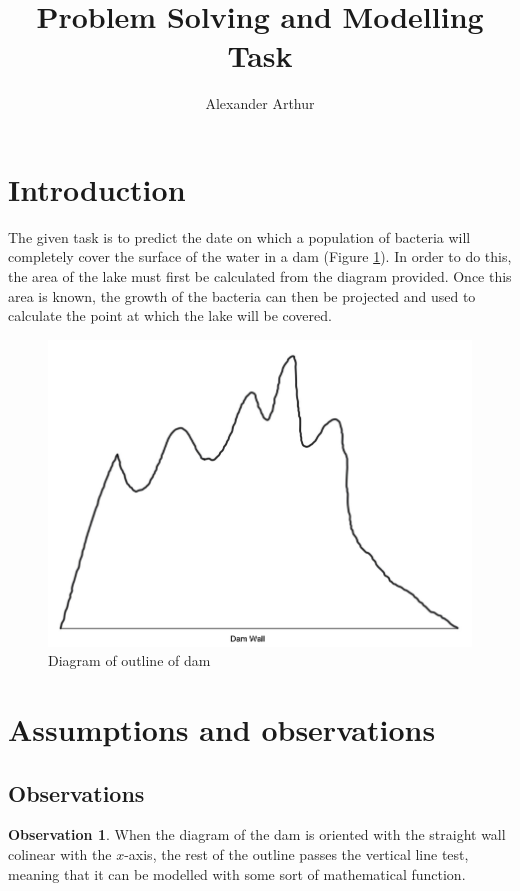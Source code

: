 \documentclass{article}
\title{Problem Solving and Modelling Task}
\author{Alexander Arthur}
\theoremstyle{definition}
\newtheorem{observation}{Observation}
\begin{document}
\maketitle
\setcounter{tocdepth}{1}
\tableofcontents

\section{Introduction}
    The given task is to predict the date on which a population of bacteria will completely cover the surface of the water in a dam (Figure \ref{figDamOutline}). In order to do this, the area of the lake must first be calculated from the diagram provided. Once this area is known, the growth of the bacteria can then be projected and used to calculate the point at which the lake will be covered.

    \begin{figure}
        \centering
        \includegraphics[width = 12cm]{damDiagram.png}
        \caption{Diagram of outline of dam}
        \label{figDamOutline}
    \end{figure}



\section{Assumptions and observations}

    \subsection{Observations}

    \begin{observation}
    When the diagram of the dam is oriented with the straight wall colinear with the $x$-axis, the rest of the outline passes the vertical line test, meaning that it can be modelled with some sort of mathematical function.
    \end{observation}
\end{document}
